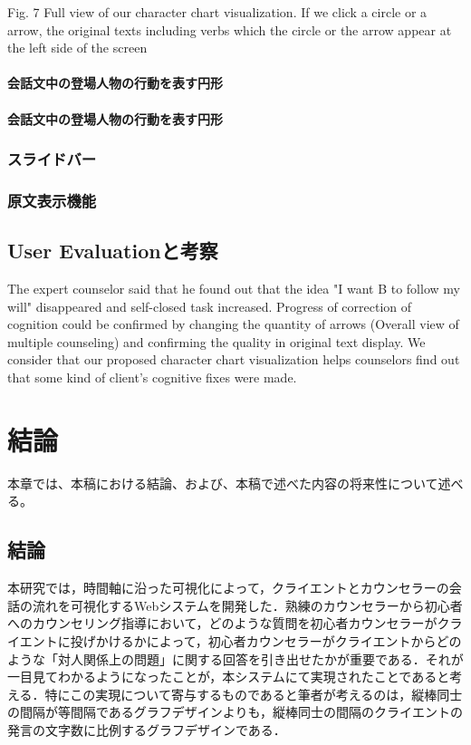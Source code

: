 \documentclass[shuuron]{kuee}
\begin{document}
Fig. 7 Full view of our character chart visualization. If we click a circle or a arrow, the original texts including verbs which the circle or the arrow appear at the left side of the screen

\subsubsection{会話文中の登場人物の行動を表す円形}
\subsubsection{会話文中の登場人物の行動を表す円形}

\subsection{スライドバー}

\subsection{原文表示機能}


\section{User Evaluationと考察}

  The expert counselor said that he found out that the idea "I want B to follow my will" disappeared and self-closed task increased. Progress of correction of cognition could be confirmed by changing the quantity of arrows (Overall view of multiple counseling) and confirming the quality in original text display. We consider that our proposed character chart visualization helps counselors find out that some kind of client's cognitive fixes were made.

\chapter{結論}

本章では、本稿における結論、および、本稿で述べた内容の将来性について述べる。

\section{結論}

本研究では，時間軸に沿った可視化によって，クライエントとカウンセラーの会話の流れを可視化するWebシステムを開発した．熟練のカウンセラーから初心者へのカウンセリング指導において，どのような質問を初心者カウンセラーがクライエントに投げかけるかによって，初心者カウンセラーがクライエントからどのような「対人関係上の問題」に関する回答を引き出せたかが重要である．それが一目見てわかるようになったことが，本システムにて実現されたことであると考える．特にこの実現について寄与するものであると筆者が考えるのは，縦棒同士の間隔が等間隔であるグラフデザインよりも，縦棒同士の間隔のクライエントの発言の文字数に比例するグラフデザインである．
\end{document}
